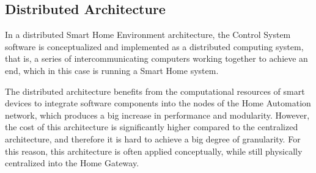 \subsection{Distributed Architecture}
In a distributed Smart Home Environment architecture, the Control System software is conceptualized and implemented as a 
distributed computing system, that is, a series of intercommunicating computers working together to achieve an end, which in this 
case is running a Smart Home system.

\bigskip
The distributed architecture benefits from the computational resources of smart devices to integrate software components into the 
nodes of the Home Automation network, which produces a big increase in performance and modularity. However, the cost of 
this architecture is significantly higher compared to the centralized architecture, and therefore it is hard to achieve a big degree of
granularity. For this reason, this architecture is often applied conceptually, while still physically centralized into the Home Gateway.



